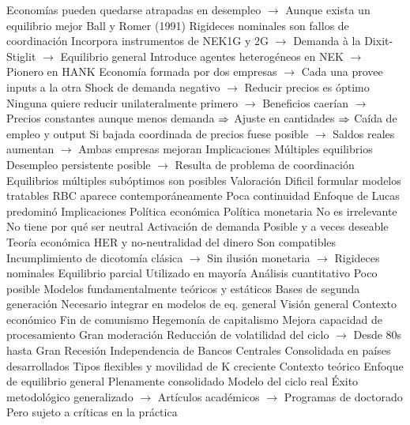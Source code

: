 \documentclass{nuevotema}
\begin{document}
\begin{esquemal}
				\4[] Economías pueden quedarse atrapadas en desempleo
				\4[] $\to$ Aunque exista un equilibrio mejor
				\4 Ball y Romer (1991)
				\4[] Rigideces nominales son fallos de coordinación
				\4[] Incorpora instrumentos de NEK1G y 2G
				\4[] $\to$ Demanda à la Dixit-Stiglit
				\4[] $\to$ Equilibrio general
				\4[] Introduce agentes heterogéneos en NEK
				\4[] $\to$ Pionero en HANK
				\4[] Economía formada por dos empresas
				\4[] $\to$ Cada una provee inputs a la otra
				\4[] Shock de demanda negativo
				\4[] $\to$ Reducir precios es óptimo
				\4[] Ninguna quiere reducir unilateralmente primero
				\4[] $\to$ Beneficios caerían
				\4[] $\to$ Precios constantes aunque menos demanda
				\4[] $\Rightarrow$ Ajuste en cantidades
				\4[] $\Rightarrow$ Caída de empleo y output
				\4[] Si bajada coordinada de precios fuese posible
				\4[] $\to$ Saldos reales aumentan
				\4[] $\to$ Ambas empresas mejoran
				\4 Implicaciones
				\4[] Múltiples equilibrios
				\4[] Desempleo persistente posible
				\4[] $\to$ Resulta de problema de coordinación
				\4[] Equilibrios múltiples subóptimos son posibles
				\4 Valoración
				\4[] Dificil formular modelos tratables
				\4[] RBC aparece contemporáneamente
				\4[] Poca continuidad
				\4[] Enfoque de Lucas predominó
		\2 Implicaciones
			\3 Política económica
				\4 Política monetaria
				\4[] No es irrelevante
				\4[] No tiene por qué ser neutral
				\4 Activación de demanda
				\4[] Posible y a veces deseable
			\3 Teoría económica
				\4 HER y no-neutralidad del dinero
				\4[] Son compatibles
				\4[] Incumplimiento de dicotomía clásica
				\4[] $\to$ Sin ilusión monetaria
				\4[] $\to$ Rigideces nominales
				\4 Equilibrio parcial
				\4[] Utilizado en mayoría
				\4 Análisis cuantitativo
				\4[] Poco posible
				\4[] Modelos fundamentalmente teóricos y estáticos
				\4 Bases de segunda generación
				\4[] Necesario integrar en modelos de eq. general
	\1 
		\2 Visión general
			\3 Contexto económico
				\4 Fin de comunismo
				\4 Hegemonía de capitalismo
				\4 Mejora capacidad de procesamiento
				\4 Gran moderación
				\4[] Reducción de volatilidad del ciclo
				\4[] $\to$ Desde 80s hasta Gran Recesión
				\4 Independencia de Bancos Centrales
				\4[] Consolidada en países desarrollados
				\4 Tipos flexibles y movilidad de K creciente
			\3 Contexto teórico
				\4 Enfoque de equilibrio general
				\4[] Plenamente consolidado
				\4 Modelo del ciclo real
				\4[] Éxito metodológico generalizado
				\4[] $\to$ Artículos académicos
				\4[] $\to$ Programas de doctorado
				\4[] Pero sujeto a críticas en la práctica

\end{esquemal}
\end{document}
